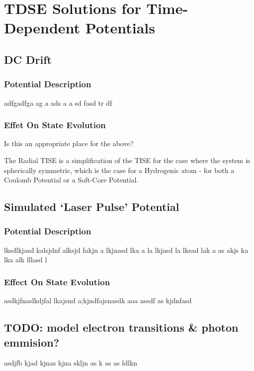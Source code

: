 
\chapter{TDSE Solutions for Time-Dependent Potentials} %

\label{Chapter4} %



\section{DC Drift}
\subsection{Potential Description}
adfgadfga ag a ads a a sd fasd  tr df 
\subsection{Effet On State Evolution}
Is this an appropriate place for the above?

The Radial TISE is a simplification of the TISE for the case where the system is spherically symmetric, which is the case for a Hydrogenic atom - for both a Coulomb Potential or a Soft-Core Potential.

\section{Simulated `Laser Pulse' Potential}
\subsection{Potential Description}
lksdlkjasd kalsjdnf alksjd fakjn a lkjnasd lka a la lkjasd la lksad lak a
as akjs ka lka alk lllasd l
\subsection{Effect On State Evolution}
asdkjfnaslkdjfal lkajsnd a;kjndfajsnasdk aoa 
assdf as kjdnfasd

\section{TODO: model electron transitions \& photon emmision?}
asdjfb kjad kjnas kjna skljn
as k as 
as ldlkn

